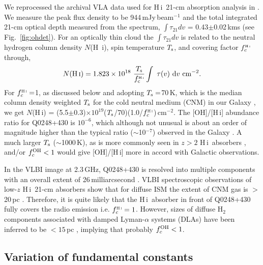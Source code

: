 \documentclass[iop,apjl,numberedappendix,appendixfloats,twocolappendix,revtex4]{emulateapj}
\newcommand{\hi}{\mbox{H\,{\sc i}}}
\begin{document}
We reprocessed the archival VLA data used for \hi\ 21-cm absorption analysis in \citet[][]{Hwang04}. We measure the peak flux density to be 
944\,mJy\,beam$^{-1}$ and the total integrated 21-cm optical depth measured from the spectrum, $\int\tau_{21}dv$ = 0.43$\pm$0.02\,kms (see Fig.~\ref{fig:ohdet}). 
For an optically thin cloud the $\int\tau_{21}dv$ is related to the neutral 
hydrogen column density $N$(H~{\sc i}), spin temperature $T_{\rm s}$, and covering factor $f_c^{\tiny \hi}$ through,
\begin{equation}
N{(\hi)}=1.823\times10^{18}~{T_{\rm s}\over f_{\rm c}^{\tiny \hi}}\int~\tau(v)~{\rm d}v~{\rm cm^{-2}}.
\label{eq1}
\end{equation}
For $f_c^{\tiny \hi} =$1, as discussed below and adopting $T_{\rm s}=$70\,K, 
which is the median column density weighted $T_{\rm s}$ for the cold neutral medium (CNM) in our 
Galaxy \citep[][]{Heiles03}, we get $N$(\hi) = (5.5$\pm$0.3)$\times10^{19}$($T_{\rm s}$/70)(1.0/$f_c^{\tiny \hi}$)\,cm$^{-2}$. 
The [OH]/[\hi] abundance ratio for Q0248+430 is $10^{-6}$, which although not unusual  
is about an order of magnitude higher than the typical ratio ($\sim$10$^{-7}$) observed in the Galaxy \citep[][]{Li18}.  
A much larger $T_{\rm s}$ ($\sim$1000\,K), as is more commonly seen in $z>2$ \hi\ absorbers \citep[][]{Srianand12dla, Kanekar14}, 
and/or $f_c^{\rm OH}<1$ would give [OH]/[\hi] more in accord with Galactic observations.  



In the VLBI image at 2.3\,GHz, Q0248+430 is resolved into multiple components with an overall extent of 26\,milliarcsecond 
\citep[27\,pc at $z_g=0.05$;][]{Fey00}.  
VLBI spectroscopic observations of low-$z$ \hi\ 21-cm absorbers show that for diffuse ISM the extent of CNM gas is 
$>$20\,pc \citep[][]{Keeney05, Gupta17gvlbi}.  
Therefore, it is quite likely that  the \hi\ absorber in front of Q0248+430 fully covers the radio emission i.e. $f_c^{\tiny \hi} =1$. 
However, sizes of diffuse H$_2$ components associated with damped Lyman-$\alpha$ systems (DLAs) have been inferred to be $<15$\,pc 
\citep[][]{Srianand12dla, Noterdaeme17}, implying that probably $f_c^{\rm OH}<1$.  




\subsection{Variation of fundamental constants}    
\label{sec:const}  
\end{document}
